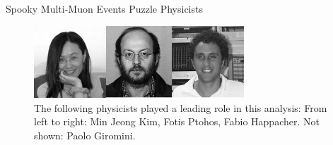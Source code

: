 \begin{MyArticle}[enhanced, tikz={rotate=0}, width=0.25\textwidth]{Spooky Multi-Muon Events Puzzle Physicists}
\begin{multicols}{2}
  \end{multicols}
    \begin{figure}
      \begin{center}
        \vspace{-0.2in}
        \leavevmode
        \includegraphics[width=0.7\textwidth]{./figures/Fotios-MinJeongKimBW.jpg}
        \caption*{The following physicists played a leading role in this analysis: From
          left to right: Min Jeong Kim, Fotis Ptohos, Fabio Happacher. Not shown: Paolo Giromini.}
      \end{center}
    \end{figure}
  
\end{MyArticle}
